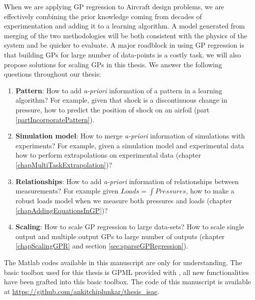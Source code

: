 When we are applying GP regression to Aircraft design problems, we are effectively combining the prior knowledge coming from decades of experimentation and adding it to a learning algorithm. A model generated from merging of the two methodologies will be both consistent with the physics of the system and be quicker to evaluate. A major roadblock in using GP regression is that building GPs for large number of data-points is a costly task, we will also propose solutions for scaling GPs in this thesis. We answer the following questions throughout our thesis:

\begin{enumerate}
\item \textbf{Pattern}: How to add \textit{a-priori} information of a pattern in a learning algorithm? For example, given that shock is a discontinuous change in pressure, how to predict the position of shock on an airfoil (part \ref{partIncorporatePattern}). 
\item \textbf{Simulation model}: How to merge \textit{a-priori} information of simulations with experiments? For example, given a simulation model and experimental data how to perform extrapolations on experimental data (chapter \ref{chapMultiTaskExtrapolation})?
\item \textbf{Relationships}: How to add \textit{a-priori} information of relationships between measurements? For example given $Loads = \int Pressures$, how to make a robust loads model when we measure both pressures and loads (chapter \ref{chapAddingEquationsInGP})?
\item \textbf{Scaling}: How to scale GP regression to large data-sets? How to scale single output and multiple output GPs to large number of outputs (chapter \ref{chapScalingGPR} and section \ref{sec:sparseGPRegression}).
\end{enumerate}

The Matlab codes available in this manuscript are only for understanding. The basic toolbox used for this thesis is GPML provided with \cite{Rasmussen2005}, all new functionalities have been grafted into this basic toolbox. The code of this manuscript is available at \url{https://github.com/ankitchiplunkar/thesis_isae}. 


